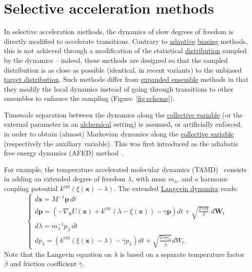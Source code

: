 \documentclass[9pt,review]{livecoms}
\newcommand{\vx}{\mathbf{x}}
\newcommand{\vp}{\mathbf{p}}
\begin{document}
\section{Selective acceleration methods}
\label{sec:selective_accel}


In selective acceleration methods, the dynamics of slow degrees of freedom is directly modified to accelerate transitions.
Contrary to \hyperlink{ref:Adaptive} {adaptive} \hyperlink{ref:biasingE} {biasing} methods, this is not achieved through a modification of the statistical \hyperlink{ref:Distribution} {distribution} sampled by the dynamics -- indeed, these methods are designed so that the sampled distribution is as close as possible (identical, in recent variants) to the unbiased \hyperlink{ref:targetdist} {target distribution}.
Such methods differ from \hyperlink{ref:ExpEns} {expanded ensemble} methods in that they modify the local dynamics instead of going through transitions to other ensembles to enhance the sampling (Figure~\ref{fig:scheme}).

Timescale separation between the dynamics along the \hyperlink{ref:CV} {collective variable} (or the external parameter in an \hyperlink{ref:Alchemical} {alchemical} setting) is assumed, or artificially enforced, in order to obtain (almost) Markovian dynamics along the \hyperlink{ref:CV} {collective variable} (respectively the auxiliary variable).
This was first introduced as the adiabatic free energy dynamics (AFED) method~\cite{doi:10.1063/1.1448491}.

For example, the temperature accelerated molecular dynamics (TAMD)~\cite{MV06} consists in adding an extended degree of freedom $\lambda$, with mass $m_\lambda$, and a harmonic coupling potential $k^\mathrm{ext} \left( \xi(\vx) - \lambda \right)$.
The extended \hyperlink{ref:Langevin} {Langevin dynamics} reads:
\begin{equation}
\left\{
\begin{array}{ll}
    d\vx = M^{-1} \vp \,  dt \\
    d\vp = \left(-\nabla_\vx U(\vx) + k^\mathrm{ext} ( \lambda -\xi(\vx)) - \gamma \vp \right) dt
    + \sqrt{ \frac{2 \gamma M}{\beta}} \; d\mathbf{W}_t \\
    d\lambda = m_\lambda^{-1} p_\lambda \, dt\\
    d p_\lambda = \left( k^\mathrm{ext} (\xi(\vx) - \lambda)  - \overline\gamma p_\lambda \right) dt
    + \sqrt{ \frac{2 \bar\gamma m_\lambda}{ \overline\beta}} dW_t.
\end{array}
\right.
\end{equation}
Note that the Langevin equation on $\lambda$ is based on a separate temperature factor $\overline \beta$ and friction coefficient $\overline{\gamma}$.
\end{document}
